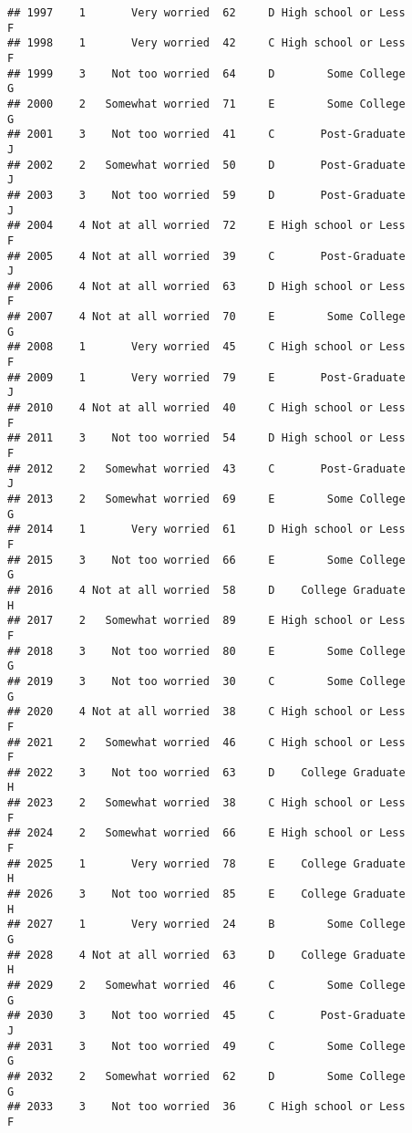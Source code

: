 \documentclass[
]{article}
\begin{document}
\begin{verbatim}
## 1997    1       Very worried  62     D High school or Less         F
## 1998    1       Very worried  42     C High school or Less         F
## 1999    3    Not too worried  64     D        Some College         G
## 2000    2   Somewhat worried  71     E        Some College         G
## 2001    3    Not too worried  41     C       Post-Graduate         J
## 2002    2   Somewhat worried  50     D       Post-Graduate         J
## 2003    3    Not too worried  59     D       Post-Graduate         J
## 2004    4 Not at all worried  72     E High school or Less         F
## 2005    4 Not at all worried  39     C       Post-Graduate         J
## 2006    4 Not at all worried  63     D High school or Less         F
## 2007    4 Not at all worried  70     E        Some College         G
## 2008    1       Very worried  45     C High school or Less         F
## 2009    1       Very worried  79     E       Post-Graduate         J
## 2010    4 Not at all worried  40     C High school or Less         F
## 2011    3    Not too worried  54     D High school or Less         F
## 2012    2   Somewhat worried  43     C       Post-Graduate         J
## 2013    2   Somewhat worried  69     E        Some College         G
## 2014    1       Very worried  61     D High school or Less         F
## 2015    3    Not too worried  66     E        Some College         G
## 2016    4 Not at all worried  58     D    College Graduate         H
## 2017    2   Somewhat worried  89     E High school or Less         F
## 2018    3    Not too worried  80     E        Some College         G
## 2019    3    Not too worried  30     C        Some College         G
## 2020    4 Not at all worried  38     C High school or Less         F
## 2021    2   Somewhat worried  46     C High school or Less         F
## 2022    3    Not too worried  63     D    College Graduate         H
## 2023    2   Somewhat worried  38     C High school or Less         F
## 2024    2   Somewhat worried  66     E High school or Less         F
## 2025    1       Very worried  78     E    College Graduate         H
## 2026    3    Not too worried  85     E    College Graduate         H
## 2027    1       Very worried  24     B        Some College         G
## 2028    4 Not at all worried  63     D    College Graduate         H
## 2029    2   Somewhat worried  46     C        Some College         G
## 2030    3    Not too worried  45     C       Post-Graduate         J
## 2031    3    Not too worried  49     C        Some College         G
## 2032    2   Somewhat worried  62     D        Some College         G
## 2033    3    Not too worried  36     C High school or Less         F

\end{verbatim}
\end{document}
